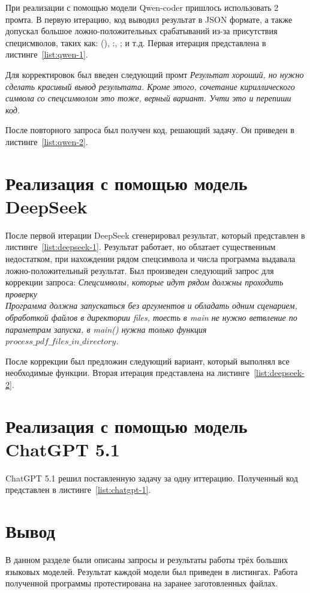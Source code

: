 При реализации с помощью модели Qwen-coder пришлось использовать 2 промта.
В первую итерацию, код выводил результат в JSON формате, а также допускал большое ложно-положительных срабатываний
из-за присутствия специсмволов, таких как: (), :, ; и т.д. Первая итерация представлена в листинге~\ref{list:qwen-1}.

Для корректировок был введен следующий промт \textit{Результат хороший, но нужно сделать красивый вывод результата.
Кроме этого, сочетание кириллического символа со спецсимволом это тоже, верный вариант. Учти это и перепиши код.}

После повторного запроса был получен код, решающий задачу. Он приведен в листинге~\ref{list:qwen-2}.

\section{Реализация с помощью модель DeepSeek}

После первой итерации DeepSeek сгенерировал результат, который представлен в листинге~\ref{list:deepseek-1}.
Результат работает, но облатает существенным недостатком, при нахождении рядом спецсимвола и числа программа выдавала ложно-положительный результат.
Был произведен следующий запрос для коррекции запроса:
\textit{Спецсимволы, которые идут рядом должны проходить проверку \\
Программа должна запускаться без аргументов и обладать одним сценарием, обработкой файлов в директории files, тоесть в main не нужно ветвление по параметрам запуска, в main() нужна только функция $process\_pdf\_files\_in\_directory$.}

После коррекции был предложин следующий вариант, который выполнял все необходимые функции. Вторая итерация представлена на листинге~\ref{list:deepseek-2}.

\section{Реализация с помощью модель ChatGPT 5.1}

ChatGPT 5.1 решил поставленную задачу за одну иттерацию.
Полученный код представлен в листинге~\ref{list:chatgpt-1}.

\section{Вывод}

В данном разделе были описаны запросы и результаты работы трёх больших языковых
моделей. Результат каждой модели был приведен в листингах.
Работа полученной программы протестирована на заранее заготовленных файлах. 
